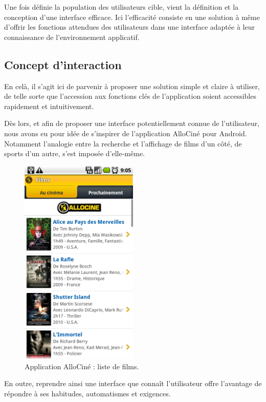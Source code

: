 \documentclass{article}
\begin{document}
	Une fois définie la population des utilisateurs cible, vient la définition et
	la conception d'une interface efficace.
	Ici l'efficacité consiste en une solution à même d'offrir les fonctions
	attendues des utilisateurs dans une interface adaptée à leur connaissance de
	l'environnement applicatif.

	\subsection{Concept d'interaction}

	En celà, il s'agit ici de parvenir à proposer une solution simple et claire à
	utiliser, de telle sorte que l'accession aux fonctions clés de l'application
	soient accessibles rapidement et intuitivement.

	Dès lors, et afin de proposer une interface potentiellement connue de
	l'utilisateur, nous avons eu pour idée de s'inspirer de l'application AlloCiné
	pour Android.
	Notamment l'analogie entre la recherche et l'affichage de films d'un côté, de
	sports d'un autre, s'est imposée d'elle-même.

	\begin{figure}[ht]
		\centering
		\includegraphics[width=0.5\textwidth]{allocine.png}
		\caption{Application AlloCiné : liste de films.}
		\label{fig:allocine}
	\end{figure}

	En outre, reprendre ainsi une interface que connaît l'utilisateur offre
	l'avantage de répondre à ses habitudes, automatismes et exigences.
\end{document}
